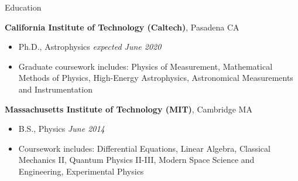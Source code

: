 \documentclass{resume} %
\begin{document}

\begin{rSection}{Education}

{\bf California Institute of Technology (Caltech)}, Pasadena CA
\begin{itemize}
  \item Ph.D., Astrophysics \hfill \emph{expected June 2020}
\item Graduate coursework includes: 
  Physics of Measurement, Mathematical Methods of Physics,
  High-Energy Astrophysics, Astronomical Measurements and Instrumentation
\end{itemize}

{\bf Massachusetts Institute of Technology (MIT)}, Cambridge MA
\begin{itemize}
\item B.S., Physics \hfill {\em June 2014}
\item Coursework includes: Differential Equations, Linear Algebra,
  Classical Mechanics II, Quantum Physics II-III,
  Modern Space Science and Engineering, Experimental Physics
\end{itemize}

\end{rSection}


\end{document}
